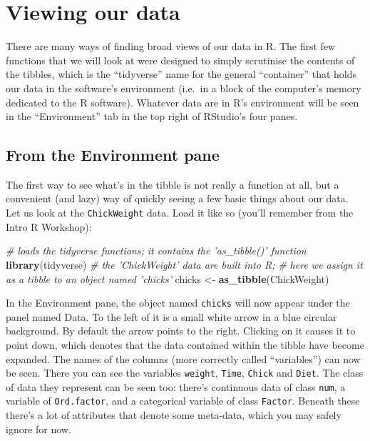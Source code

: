 \documentclass[english,10pt,a4paper,oneside]{book}
\newenvironment{Shaded}{\begin{snugshade}}{\end{snugshade}}
\newcommand{\KeywordTok}[1]{\textcolor[rgb]{0.13,0.29,0.53}{\textbf{#1}}}
\newcommand{\StringTok}[1]{\textcolor[rgb]{0.31,0.60,0.02}{#1}}
\newcommand{\CommentTok}[1]{\textcolor[rgb]{0.56,0.35,0.01}{\textit{#1}}}
\newcommand{\NormalTok}[1]{#1}
\theoremstyle{definition}
\theoremstyle{definition}
\theoremstyle{definition}
\theoremstyle{remark}
\begin{document}
\section{Viewing our data}\label{viewing-our-data}

There are many ways of finding broad views of our data in R. The first
few functions that we will look at were designed to simply scrutinise
the contents of the tibbles, which is the \enquote{tidyverse} name for
the general \enquote{container} that holds our data in the software's
environment (i.e.~in a block of the computer's memory dedicated to the R
software). Whatever data are in R's environment will be seen in the
\enquote{Environment} tab in the top right of RStudio's four panes.

\subsection{From the Environment pane}\label{from-the-environment-pane}

The first way to see what's in the tibble is not really a function at
all, but a convenient (and lazy) way of quickly seeing a few basic
things about our data. Let us look at the \texttt{ChickWeight} data.
Load it like so (you'll remember from the Intro R Workshop):

\begin{Shaded}
\begin{Highlighting}[]
\CommentTok{# loads the tidyverse functions; it contains the 'as_tibble()' function}
\KeywordTok{library}\NormalTok{(tidyverse)}
\CommentTok{# the 'ChickWeight' data are built into R;}
\CommentTok{# here we assign it as a tibble to an object named 'chicks'}
\NormalTok{chicks <-}\StringTok{ }\KeywordTok{as_tibble}\NormalTok{(ChickWeight)}
\end{Highlighting}
\end{Shaded}

In the Environment pane, the object named \texttt{chicks} will now
appear under the panel named Data. To the left of it is a small white
arrow in a blue circular background. By default the arrow points to the
right. Clicking on it causes it to point down, which denotes that the
data contained within the tibble have become expanded. The names of the
columns (more correctly called \enquote{variables}) can now be seen.
There you can see the variables \texttt{weight}, \texttt{Time},
\texttt{Chick} and \texttt{Diet}. The class of data they represent can
be seen too: there's continuous data of class \texttt{num}, a variable
of \texttt{Ord.factor}, and a categorical variable of class
\texttt{Factor}. Beneath these there's a lot of attributes that denote
some meta-data, which you may safely ignore for now.
\end{document}
